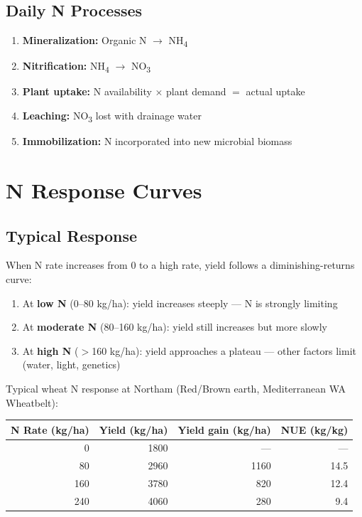 \subsection{Daily N Processes}

\begin{enumerate}
  \item \textbf{Mineralization:} Organic N $\to$ NH\textsubscript{4}
  \item \textbf{Nitrification:} NH\textsubscript{4} $\to$ NO\textsubscript{3}
  \item \textbf{Plant uptake:} N availability $\times$ plant demand $=$ actual uptake
  \item \textbf{Leaching:} NO\textsubscript{3} lost with drainage water
  \item \textbf{Immobilization:} N incorporated into new microbial biomass
\end{enumerate}

\section{N Response Curves}

\subsection{Typical Response}

When N rate increases from 0 to a high rate, yield follows a diminishing-returns curve:

\begin{enumerate}
  \item At \textbf{low N} (0--80 kg/ha): yield increases steeply — N is strongly limiting
  \item At \textbf{moderate N} (80--160 kg/ha): yield still increases but more slowly
  \item At \textbf{high N} ($>$160 kg/ha): yield approaches a plateau — other factors limit (water, light, genetics)
\end{enumerate}

Typical wheat N response at Northam (Red/Brown earth, Mediterranean WA Wheatbelt):

\begin{center}
\begin{tabular}{r|r|r|r}
\textbf{N Rate (kg/ha)} & \textbf{Yield (kg/ha)} & \textbf{Yield gain (kg/ha)} & \textbf{NUE (kg/kg)} \\
\hline
0   & 1800 & ---  & --- \\
80  & 2960 & 1160 & 14.5 \\
160 & 3780 & 820  & 12.4 \\
240 & 4060 & 280  & 9.4 \\
\end{tabular}
\end{center}

